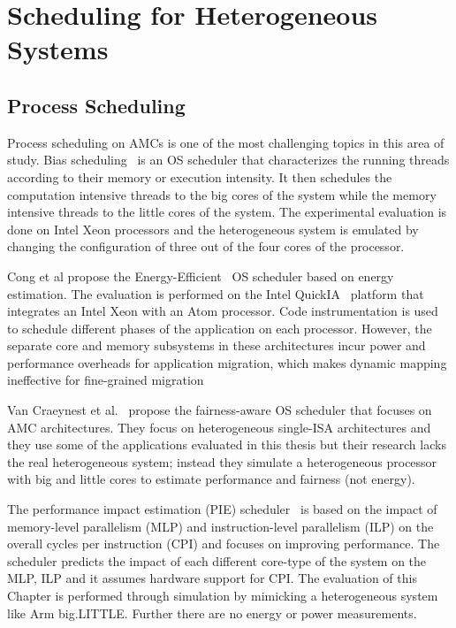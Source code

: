 \section{Scheduling for Heterogeneous Systems}
\label{sec.related.scheduling}



\subsection{Process Scheduling}
Process scheduling on AMCs is one of the most challenging topics in this area of study.
Bias scheduling~\cite{Koufaty_bias} is an OS scheduler that characterizes the running 
threads according to their memory or execution intensity. 
It then schedules the computation intensive threads to the big cores of the system while the memory intensive threads to the little cores of the system.
The experimental evaluation is done on Intel Xeon processors and the heterogeneous system is emulated by changing the configuration of three out of the four cores of the processor.

Cong et al propose the Energy-Efficient~\cite{Cong_quickIA} OS scheduler based on energy estimation. The evaluation is performed on the Intel QuickIA~\cite{quickIA} platform that integrates an Intel Xeon with an Atom processor. 
Code instrumentation is used to schedule different phases of the application on each processor. However, the separate core and memory subsystems in these architectures incur power and performance overheads for application migration, which makes dynamic mapping ineffective for fine-grained migration

Van Craeynest et al.~\cite{VanCraeynest_fairness} propose the fairness-aware OS scheduler that focuses on AMC architectures. 
They focus on heterogeneous single-ISA architectures and they use some of the applications evaluated in this thesis but their research lacks the real heterogeneous system; instead they simulate a heterogeneous processor with big and little cores to estimate performance and fairness (not energy).

The performance impact estimation (PIE) scheduler~\cite{VanCraeynest_PIE} is based on the impact of memory-level parallelism (MLP) and instruction-level parallelism (ILP) on the overall cycles per instruction (CPI) and focuses on improving performance.
The scheduler predicts the impact of each different core-type of the system on the MLP, ILP and it assumes hardware support for CPI. 
The evaluation of this Chapter is performed through simulation by mimicking a heterogeneous system like Arm big.LITTLE. 
Further there are no energy or power measurements.


